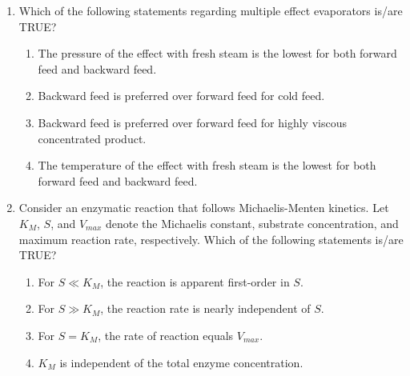 \documentclass[journal,12pt,onecolumn]{IEEEtran}
\theoremstyle{remark}
\begin{document}
\begin{enumerate}
		\hfill{}
		
		\begin{enumerate}
			\item {} - ,  - ,  -
			\item {} -,  - , -
			\item {} - ,  - ,  - 
			\item {} - ,  - ,  - 
		\end{enumerate}
		
		\item Which of the following statements regarding multiple effect evaporators is/are TRUE?
		
		\hfill{}
		
		\begin{enumerate}
			\item The pressure of the effect with fresh steam is the lowest for both forward feed and backward feed.
			\item Backward feed is preferred over forward feed for cold feed.
			\item Backward feed is preferred over forward feed for highly viscous concentrated product.
			\item The temperature of the effect with fresh steam is the lowest for both forward feed and backward feed.
		\end{enumerate}
		
		\item Consider an enzymatic reaction that follows Michaelis-Menten kinetics. Let $K_M$, $S$, and $V_{max}$ denote the Michaelis constant, substrate concentration, and maximum reaction rate, respectively. Which of the following statements is/are TRUE?
		
		\hfill{}
		
		\begin{enumerate}
			\item For $S \ll K_M$, the reaction is apparent first-order in $S$.
			\item For $S \gg K_M$, the reaction rate is nearly independent of $S$.
			\item For $S = K_M$, the rate of reaction equals $V_{max}$.
			\item $K_M$ is independent of the total enzyme concentration.
		\end{enumerate}
		

\end{enumerate}
\end{document}
